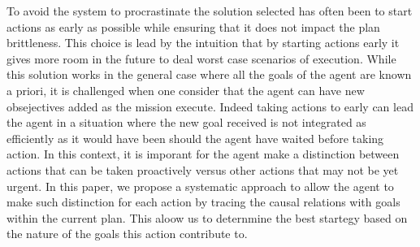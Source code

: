 To avoid the system to procrastinate the solution selected has often 
been to start actions as early as possible while ensuring that it does 
not impact the plan brittleness. This choice is lead by the intuition that by
starting actions early it gives more room in the future to deal worst
case scenarios of execution. While this solution works in the general 
case where all the goals of the agent are known a priori, it is
challenged when one consider that the agent can have new obsejectives
added as the mission execute. Indeed taking actions to early can lead
the agent in a situation where the new goal received is not integrated
as efficiently as it would have been should the agent have waited
before taking action. In this context, it is imporant for the agent
make a distinction between actions that can be taken proactively
versus other actions that may not be yet urgent.  In this paper, we
propose a systematic approach to allow the agent to make such
distinction for each action by tracing the causal relations with
 goals within the current plan.  This aloow us to deternmine the best
 startegy based on the nature of the goals this action contribute to.


